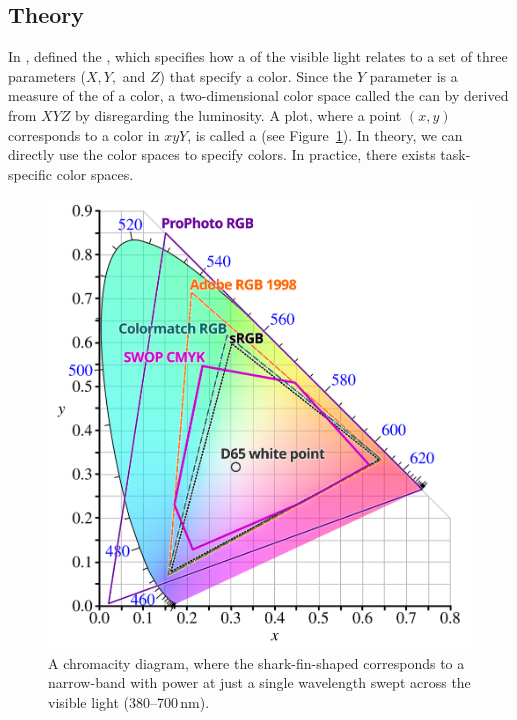 \subsection{Theory}
In \citeyear{cie32},  defined the , which specifies how a
 of the visible light relates to a set of three parameters ($X,
Y,$ and $Z$) that specify a color. Since the $Y$ parameter is a measure of the
 of a color, a two-dimensional color space called the
 can by derived
from  $XYZ$ by disregarding the luminosity.
A plot, where a point $(x, y)$ corresponds to a color in  $xyY$,
is called a  (see Figure~\ref{fig:chromacity-diagram}).
In theory, we can directly use the  color spaces to specify
colors. In practice, there exists task-specific color spaces.

\begin{figure}
  \includegraphics[width=\textwidth]{examples/03/CIExy1931}
  \caption{A chromacity diagram, where the shark-fin-shaped 
    corresponds to a narrow-band  with power at just a single
    wavelength swept across the visible light (380–700\,nm).}
  \label{fig:chromacity-diagram}
\end{figure}

